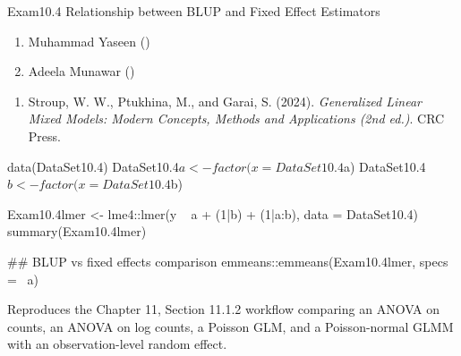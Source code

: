 \documentclass[a4paper]{book}
\begin{document}
%
\begin{Description}
Exam10.4 Relationship between BLUP and Fixed Effect Estimators
\end{Description}
%
\begin{Author}
\begin{enumerate}

\item{}  Muhammad Yaseen ()
\item{} Adeela Munawar ()

\end{enumerate}

\end{Author}
%
\begin{References}
\begin{enumerate}

\item{} Stroup, W. W., Ptukhina, M., and Garai, S. (2024).
\emph{Generalized Linear Mixed Models: Modern Concepts, Methods and Applications (2nd ed.)}.
CRC Press.

\end{enumerate}

\end{References}
%
\begin{SeeAlso}
\end{SeeAlso}
%
\begin{Examples}
\begin{ExampleCode}

data(DataSet10.4)
DataSet10.4$a <- factor(x = DataSet10.4$a)
DataSet10.4$b <- factor(x = DataSet10.4$b)

Exam10.4lmer <- lme4::lmer(y ~ a + (1|b) + (1|a:b), data = DataSet10.4)
summary(Exam10.4lmer)

## BLUP vs fixed effects comparison
emmeans::emmeans(Exam10.4lmer, specs = ~a)

\end{ExampleCode}
\end{Examples}
%
\begin{Description}
Reproduces the Chapter 11, Section 11.1.2 workflow comparing an ANOVA on
counts, an ANOVA on log counts, a Poisson GLM, and a Poisson-normal GLMM
with an observation-level random effect.
\end{Description}
\end{document}
